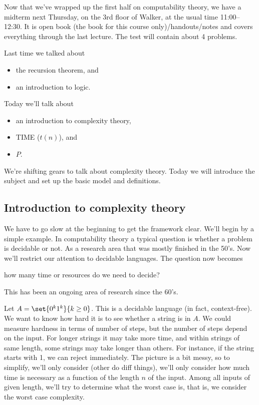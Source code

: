 
Now that we've wrapped up the first half on computability theory, we have a midterm next Thursday, on the 3rd floor of Walker, at the usual time 11:00--12:30. It is open book (the book for this course only)/handouts/notes and covers everything through the last lecture. The test will contain about 4 problems.

Last time we talked about
\begin{itemize}
\item
the recursion theorem, and
\item
an introduction to logic.
\end{itemize}
Today we'll talk about
\begin{itemize}
\item
an introduction to complexity theory,
\item
TIME ($t(n)$), and
\item
$P$.
\end{itemize}

We're shifting gears to talk about complexity theory. Today we will introduce the subject and set up the basic model and definitions.
\subsection{Introduction to complexity theory}
We have to go slow at the beginning to get the framework clear. We'll begin by a simple example. In computability theory a typical question is whether a problem is decidable or not. As a research area that was mostly finished in the 50's. Now we'll restrict our attention to decidable languages. The question now becomes

\begin{center}
how many time or resources do we need to decide?
\end{center}

This has been an ongoing area of research since the 60's.

Let $A=\set{0^k1^k}{k\ge 0}$. This is a decidable language (in fact, context-free). We want to know how hard it is to see whether a string is in $A$. We could measure hardness in terms of number of steps, but the number of steps depend on the input. For longer strings it may take more time, and within strings of same length, some strings may take longer than others. For instance, if the string starts with 1, we can reject immediately. The picture is a bit messy, so to simplify, we'll only consider (other do diff things), we'll only consider how much time is necessary as a function of the length $n$ of the input.  %
Among all inputs of given length, we'll try to determine what the worst case is, that is, we consider the worst case complexity. %

